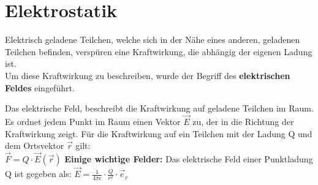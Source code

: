 \section{Elektrostatik}
\label{chap:Style}


Elektrisch geladene Teilchen, welche sich in der Nähe eines anderen, geladenen Teilchen befinden, verspüren eine Kraftwirkung, die abhängig der eigenen Ladung ist. \\
Um diese Kraftwirkung zu beschreiben, wurde der Begriff des \textbf{elektrischen Feldes} eingeführt.

\beginip
Das elektrische Feld, beschreibt die Kraftwirkung auf geladene Teilchen im Raum. \\
Es ordnet jedem Punkt im Raum einen Vektor $\vec{E}$ zu, der in die Richtung der Kraftwirkung zeigt.
Für die Kraftwirkung auf ein Teilchen mit der Ladung Q und dem Ortsvektor $\vec{r}$ gilt: \\
\formulaBegin
$\vec{F} = Q \cdot \vec{E}(\vec{r})$
\formulaEnd
\iend
\fspace
\textbf{Einige wichtige Felder:}
\beginbsp
Das elektrische Feld einer Punktladung Q ist gegeben als:
\formulaBegin
$\displaystyle \vec{E} = \frac{1}{4 \pi \epsilon} \cdot \frac{Q}{r^2}\cdot \vec{e}_r$
\formulaEnd
\begin{center}
\end{center}
\iend

\newpage


